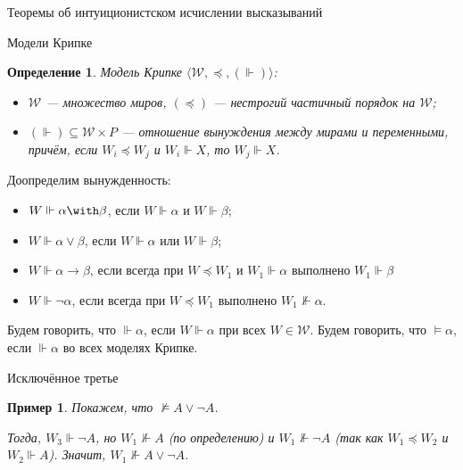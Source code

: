 \documentclass[aspectratio=169]{beamer}
\begin{document}
\newtheorem{axiom}{Аксиома}
\newtheorem{exmprus}{Пример}
\newtheorem{defrus}{Определение}
\newtheorem{lemmarus}{Лемма}
\newtheorem{thmrus}{Теорема}

\begin{frame}{}
\begin{center}\Large Теоремы об интуиционистском исчислении высказываний\end{center}
\end{frame}

\begin{frame}{Модели Крипке}
\begin{defrus}Модель Крипке $\langle \mathcal{W}, \preceq, (\Vdash)\rangle$:
\begin{itemize}
\item $\mathcal{W}$ --- множество миров, $(\preceq)$ --- нестрогий частичный порядок на $\mathcal{W}$;
\item $(\Vdash)\subseteq \mathcal{W}\times P$ --- отношение вынуждения
между мирами и переменными, причём, если $W_i \preceq W_j$ и $W_i \Vdash X$, то $W_j \Vdash X$.
\end{itemize}
\end{defrus}

Доопределим вынужденность:
\begin{itemize}
\item $W \Vdash \alpha\with\beta$, если $W \Vdash \alpha$ и $W \Vdash \beta$;
\item $W \Vdash \alpha\vee\beta$, если $W \Vdash \alpha$ или $W \Vdash \beta$;
\item $W \Vdash \alpha\rightarrow\beta$, если всегда при $W \preceq W_1$ и $W_1 \Vdash \alpha$ выполнено $W_1 \Vdash \beta$
\item $W \Vdash \neg\alpha$, если всегда при $W \preceq W_1$ выполнено $W_1 \not\Vdash \alpha$.
\end{itemize}

Будем говорить, что $\Vdash\alpha$, если $W\Vdash\alpha$ при всех $W \in \mathcal{W}$.
Будем говорить, что $\models\alpha$, если $\Vdash\alpha$ во всех моделях Крипке.
\end{frame}

\begin{frame}{Исключённое третье}
\begin{exmprus}
Покажем, что $\not\models A \vee \neg A$. 
\begin{center}\end{center}

Тогда, $W_3 \Vdash \neg A$, но $W_1 \not\Vdash A$ (по определению) и $W_1 \not\Vdash \neg A$ (так как
$W_1 \preceq W_2$ и $W_2 \Vdash A$). Значит, $W_1 \not\Vdash A \vee \neg A$.
\end{exmprus}
\end{frame}
\end{document}
